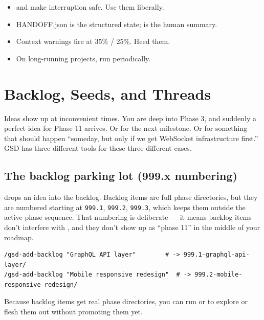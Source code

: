 \documentclass[11pt,letterpaper,openany]{book}
\begin{document}
\begin{gsdnote}[title=Key Takeaways]
\begin{itemize}[itemsep=2pt,leftmargin=1.2em]
  \item {} and  make interruption safe. Use them liberally.
  \item HANDOFF.json is the structured state;  is the human summary.
  \item Context warnings fire at 35\% / 25\%. Heed them.
  \item On long-running projects, run  periodically.
\end{itemize}
\end{gsdnote}

\chapter{Backlog, Seeds, and Threads}

Ideas show up at inconvenient times. You are deep into Phase 3, and suddenly a perfect idea for Phase 11 arrives. Or for the next milestone. Or for something that should happen ``someday, but only if we get WebSocket infrastructure first.'' GSD has three different tools for these three different cases.

\section{The backlog parking lot (999.x numbering)}

 drops an idea into the backlog. Backlog items are full phase directories, but they are numbered starting at \texttt{999.1}, \texttt{999.2}, \texttt{999.3}, which keeps them outside the active phase sequence. That numbering is deliberate --- it means backlog items don't interfere with , and they don't show up as ``phase 11'' in the middle of your roadmap.

\begin{lstlisting}
/gsd-add-backlog "GraphQL API layer"        # -> 999.1-graphql-api-layer/
/gsd-add-backlog "Mobile responsive redesign"  # -> 999.2-mobile-responsive-redesign/
\end{lstlisting}

Because backlog items get real phase directories, you can run  or  to explore or flesh them out without promoting them yet.
\end{document}
